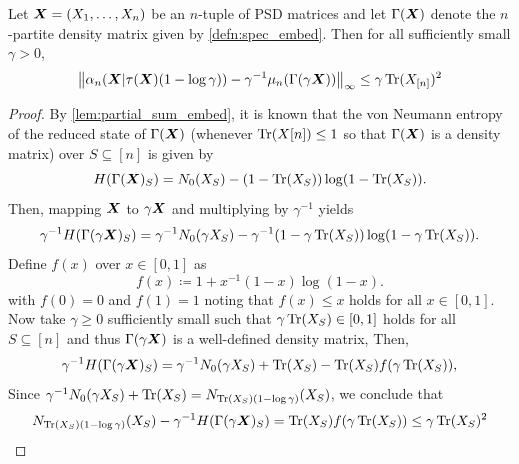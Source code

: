 \documentclass[notitlepage, 10pt]{article}
\begin{document}
\begin{thm}
    \label{thm:almost_subcone}
    Let $\boldsymbol{X} = (X_1, \ldots, X_n)$ be an $n$-tuple of PSD matrices and let $\Gamma(\boldsymbol{X})$ denote the $n$-partite density matrix given by \cref{defn:spec_embed}.
    Then for all sufficiently small $\gamma > 0$,
    \begin{equation}
        \left\lVert \alpha_n(\boldsymbol{X}|\tau(\boldsymbol{X})(1-\log \gamma)) - \gamma^{-1}\mu_n(\Gamma(\gamma\boldsymbol{ X})) \right\rVert_{\infty} \leq \gamma \operatorname{Tr}(X_{[n]})^2
    \end{equation}
\end{thm}
\begin{proof}
    By \cref{lem:partial_sum_embed}, it is known that the von Neumann entropy of the reduced state of $\Gamma(\boldsymbol{X})$ (whenever $\operatorname{Tr}(X[n])\leq 1$ so that $\Gamma(\boldsymbol{X})$ is a density matrix) over $S \subseteq [n]$ is given by
    \begin{equation}
        H(\Gamma(\boldsymbol{X})_S) = N_0(X_S) - (1-\operatorname{Tr}(X_S)) \log(1-\operatorname{Tr}(X_S)).
    \end{equation}
    Then, mapping $\boldsymbol{X}$ to $\gamma \boldsymbol{X}$ and multiplying by $\gamma^{-1}$ yields
    \begin{equation}
        \gamma^{-1}H(\Gamma(\gamma \boldsymbol{X})_S) = \gamma^{-1}N_0(\gamma X_S) - \gamma^{-1}(1-\gamma\operatorname{Tr}(X_S)) \log(1-\gamma\operatorname{Tr}(X_S)).
    \end{equation}
    Define $f(x)$ over $x \in [0,1]$ as
    \begin{equation}
        f(x) \coloneqq 1 + x^{-1} (1-x)\log(1-x).
    \end{equation}
    with $f(0) = 0$ and $f(1) = 1$ noting that $f(x) \leq x$ holds for all $x \in [0,1]$.
    Now take $\gamma \geq 0$ sufficiently small such that $\gamma \operatorname{Tr}(X_S) \in [0,1]$ holds for all $S \subseteq [n]$ and thus $\Gamma(\gamma \boldsymbol{X})$ is a well-defined density matrix,
    Then,
    \begin{equation}
        \gamma^{-1}H(\Gamma(\gamma \boldsymbol{X})_S) = \gamma^{-1}N_0(\gamma X_S) + \operatorname{Tr}(X_S) - \operatorname{Tr}(X_S)f(\gamma \operatorname{Tr}(X_S)),
    \end{equation}
    Since $\gamma^{-1}N_0(\gamma X_S) + \operatorname{Tr}(X_S) = N_{\operatorname{Tr}(X_S)(1-\log \gamma)}(X_S)$, we conclude that
    \begin{equation}
        N_{\operatorname{Tr}(X_S)(1-\log \gamma)}(X_S) - \gamma^{-1}H(\Gamma(\gamma \boldsymbol{X})_S) = \operatorname{Tr}(X_S) f(\gamma \operatorname{Tr}(X_S)) \leq \gamma \operatorname{Tr}(X_S)^2
    \end{equation}
\end{proof}
\end{document}
